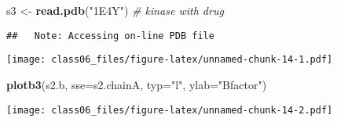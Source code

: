\documentclass[
]{article}
\newenvironment{Shaded}{\begin{snugshade}}{\end{snugshade}}
\newcommand{\CommentTok}[1]{\textcolor[rgb]{0.56,0.35,0.01}{\textit{#1}}}
\newcommand{\DataTypeTok}[1]{\textcolor[rgb]{0.13,0.29,0.53}{#1}}
\newcommand{\KeywordTok}[1]{\textcolor[rgb]{0.13,0.29,0.53}{\textbf{#1}}}
\newcommand{\NormalTok}[1]{#1}
\newcommand{\OperatorTok}[1]{\textcolor[rgb]{0.81,0.36,0.00}{\textbf{#1}}}
\newcommand{\StringTok}[1]{\textcolor[rgb]{0.31,0.60,0.02}{#1}}
\begin{document}
\begin{Shaded}
\begin{Highlighting}[]
\NormalTok{s3 <-}\StringTok{ }\KeywordTok{read.pdb}\NormalTok{(}\StringTok{"1E4Y"}\NormalTok{) }\CommentTok{# kinase with drug}
\end{Highlighting}
\end{Shaded}

\begin{verbatim}
##   Note: Accessing on-line PDB file
\end{verbatim}

\begin{Shaded}
\end{Shaded}

\texttt{[image: class06\_files/figure-latex/unnamed-chunk-14-1.pdf]}

\begin{Shaded}
\begin{Highlighting}[]
\KeywordTok{plotb3}\NormalTok{(s2.b, }\DataTypeTok{sse=}\NormalTok{s2.chainA, }\DataTypeTok{typ=}\StringTok{"l"}\NormalTok{, }\DataTypeTok{ylab=}\StringTok{"Bfactor"}\NormalTok{)}
\end{Highlighting}
\end{Shaded}

\texttt{[image: class06\_files/figure-latex/unnamed-chunk-14-2.pdf]}
\end{document}
